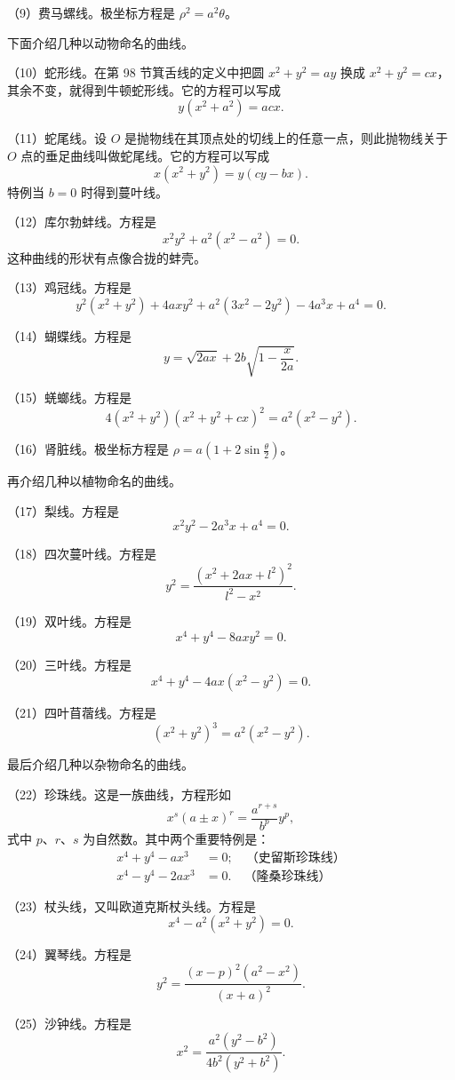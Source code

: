 （9）费马螺线。极坐标方程是 $\rho^2 = a^2 \theta$。

下面介绍几种以动物命名的曲线。

（10）蛇形线。在第 98 节箕舌线的定义中把圆 $x^2 + y^2 = ay$ 换成 $x^2 + y^2 = cx$，其余不变，就得到牛顿蛇形线。它的方程可以写成
\[
  y(x^2 + a^2) = acx.
\]

（11）蛇尾线。设 $O$ 是抛物线在其顶点处的切线上的任意一点，则此抛物线关于 $O$ 点的垂足曲线叫做蛇尾线。它的方程可以写成
\[
  x(x^2 + y^2) = y(cy - bx).
\]
特例当 $b = 0$ 时得到蔓叶线。

（12）库尔勃蚌线。方程是
\[
  x^2 y^2 + a^2(x^2 - a^2) = 0.
\]
这种曲线的形状有点像合拢的蚌壳。

（13）鸡冠线。方程是
\[
  y^2(x^2 + y^2) + 4axy^2 + a^2(3x^2 - 2y^2) - 4a^3 x + a^4 = 0.
\]

（14）蝴蝶线。方程是
\[
  y = \sqrt{2ax} + 2b\sqrt{1 - \frac{x}{2a}}.
\]

（15）蜣螂线。方程是
\[
  4(x^2 + y^2)(x^2 + y^2 + cx)^2 = a^2(x^2 - y^2).
\]

（16）肾脏线。极坐标方程是 $\rho = a\left(1 + 2\sin\frac{\theta}{2}\right)$。

再介绍几种以植物命名的曲线。

（17）梨线。方程是
\[
  x^2 y^2 - 2a^3 x + a^4 = 0.
\]

（18）四次蔓叶线。方程是
\[
  y^2 = \frac{(x^2 + 2ax + l^2)^2}{l^2 - x^2}.
\]

（19）双叶线。方程是
\[
  x^4 + y^4 - 8axy^2 = 0.
\]

（20）三叶线。方程是
\[
  x^4 + y^4 - 4ax(x^2 - y^2) = 0.
\]

（21）四叶苜蓿线。方程是
\[
  (x^2 + y^2)^3 = a^2(x^2 - y^2).
\]

最后介绍几种以杂物命名的曲线。

（22）珍珠线。这是一族曲线，方程形如
\[
  x^s(a \pm x)^r = \frac{a^{r+s}}{b^p} y^p,
\]
式中 $p$、$r$、$s$ 为自然数。其中两个重要特例是：
\begin{align*}
  x^4 + y^4 - ax^3 &= 0; \quad \text{（史留斯珍珠线）} \\
  x^4 - y^4 - 2ax^3 &= 0. \quad \text{（隆桑珍珠线）}
\end{align*}

（23）杖头线，又叫欧道克斯杖头线。方程是
\[
  x^4 - a^2(x^2 + y^2) = 0.
\]

（24）翼琴线。方程是
\[
  y^2 = \frac{(x - p)^2(a^2 - x^2)}{(x + a)^2}.
\]

（25）沙钟线。方程是
\[
  x^2 = \frac{a^2(y^2 - b^2)}{4b^2(y^2 + b^2)}.
\]

